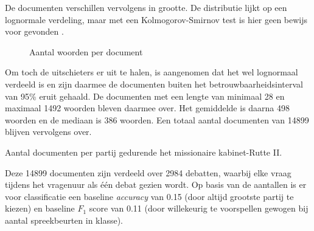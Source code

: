 De documenten verschillen vervolgens in grootte. De distributie lijkt op een lognormale verdeling, maar met een Kolmogorov-Smirnov test is hier geen bewijs voor gevonden \cite{Scipy}.

\begin{figure}[H]
    \centering
    \hspace*{-1in}
    \caption{Aantal woorden per document}%
    \label{fig:example}%
\end{figure}
Om toch de uitschieters er uit te halen, is aangenomen dat het wel lognormaal verdeeld is en zijn daarmee de documenten buiten het betrouwbaarheidsinterval van 95\% eruit gehaald. De documenten met een lengte van minimaal 28 en maximaal 1492 woorden bleven daarmee over. Het gemiddelde is daarna 498 woorden en de mediaan is 386 woorden. Een totaal aantal documenten van 14899 blijven vervolgens over.\par

\begin{table}[H]
\label{aantallen}
\caption{Aantal documenten per partij gedurende het missionaire kabinet-Rutte II.}
\centering

\end{table}
Deze 14899 documenten zijn verdeeld over 2984 debatten, waarbij elke vraag tijdens het vragenuur als één debat gezien wordt. Op basis van de aantallen is er voor classificatie een baseline \textit{accuracy} van 0.15 (door altijd grootste partij te kiezen) en baseline $F_1$ score van 0.11 (door willekeurig te voorspellen gewogen bij aantal spreekbeurten in klasse).\par


